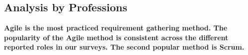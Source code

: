 \subsection{Analysis by Professions}
\label{analyze_by_professions}


% 
% 
% 
\bf{Agile is the most practiced requirement gathering method. The popularity of the Agile method is consistent across the different reported roles in our surveys.} The second popular method is Scrum.

